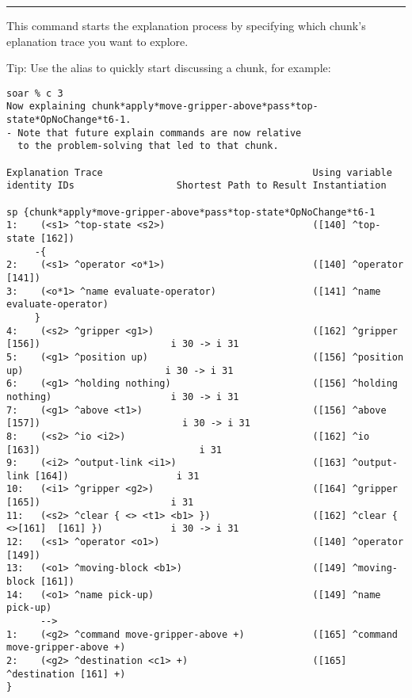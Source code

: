 \rule{\textwidth}{1pt}

\textbf{}

This command starts the explanation process by specifying which chunk's eplanation trace you want to explore.

Tip: Use the alias  to quickly start discussing a chunk, for example:

{\tiny
\begin{verbatim}
soar % c 3
Now explaining chunk*apply*move-gripper-above*pass*top-state*OpNoChange*t6-1.
- Note that future explain commands are now relative
  to the problem-solving that led to that chunk.

Explanation Trace                                     Using variable identity IDs                  Shortest Path to Result Instantiation

sp {chunk*apply*move-gripper-above*pass*top-state*OpNoChange*t6-1
1:    (<s1> ^top-state <s2>)                          ([140] ^top-state [162])
     -{
2:    (<s1> ^operator <o*1>)                          ([140] ^operator [141])
3:    (<o*1> ^name evaluate-operator)                 ([141] ^name evaluate-operator)
     }
4:    (<s2> ^gripper <g1>)                            ([162] ^gripper [156])                       i 30 -> i 31
5:    (<g1> ^position up)                             ([156] ^position up)                         i 30 -> i 31
6:    (<g1> ^holding nothing)                         ([156] ^holding nothing)                     i 30 -> i 31
7:    (<g1> ^above <t1>)                              ([156] ^above [157])                         i 30 -> i 31
8:    (<s2> ^io <i2>)                                 ([162] ^io [163])                            i 31
9:    (<i2> ^output-link <i1>)                        ([163] ^output-link [164])                   i 31
10:   (<i1> ^gripper <g2>)                            ([164] ^gripper [165])                       i 31
11:   (<s2> ^clear { <> <t1> <b1> })                  ([162] ^clear { <>[161]  [161] })            i 30 -> i 31
12:   (<s1> ^operator <o1>)                           ([140] ^operator [149])
13:   (<o1> ^moving-block <b1>)                       ([149] ^moving-block [161])
14:   (<o1> ^name pick-up)                            ([149] ^name pick-up)
      -->
1:    (<g2> ^command move-gripper-above +)            ([165] ^command move-gripper-above +)
2:    (<g2> ^destination <c1> +)                      ([165] ^destination [161] +)
}
\end{verbatim}
}

